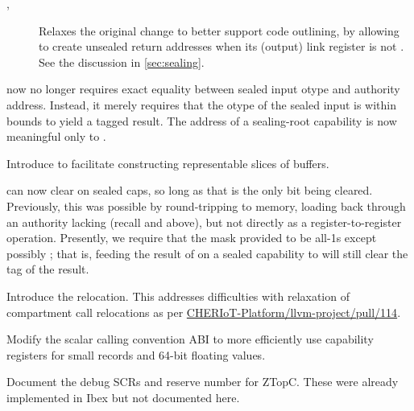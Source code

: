 \begin{description}
\begin{description}
      \begin{description}
        \item[, ] Relaxes the original change to better support code outlining,
          by allowing  to create unsealed return addresses
          when its (output) link register is not .
          See the discussion in \cref{sec:sealing}.
      \end{description}
    \item[\ghissue{71}, \ghpr{87}]  now no longer requires exact equality between sealed input otype and authority address.
      Instead, it merely requires that the otype of the sealed input is within bounds to yield a tagged result.
      The address of a sealing-root capability is now meaningful only to .
    \item[\ghissue{72},\ghpr{74}] Introduce  to facilitate constructing representable slices of buffers.
    \item[\ghissue{70},\ghpr{83}]  can now clear \cappermG on sealed caps, so long as that is the only bit being cleared.
      Previously, this was possible by round-tripping to memory, loading back through an authority lacking \cappermILG(recall  and  above), but not directly as a register-to-register operation.
      Presently, we require that the mask provided to  be all-1s except possibly \cappermG;
      that is, feeding the result of  on a sealed capability to  will still clear the tag of the result.
    \item[\ghpr{97}] Introduce the  relocation. This addresses difficulties with relaxation of compartment call relocations as per 
    \href{https://github.com/CHERIoT-Platform/llvm-project/pull/114}{CHERIoT-Platform/llvm-project/pull/114}.
    \item[\ghpr{104}, \ghpr{105}] Modify the scalar calling convention ABI to more efficiently use capability registers for small records and 64-bit floating values.
    \item[\ghpr{106}] Document the debug SCRs and reserve number for ZTopC. These were already implemented in Ibex but not documented here.
  \end{description}
\end{description}
